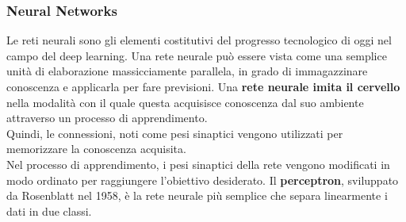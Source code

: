 \begin{frame}

	\frametitle{Neural Networks}

	Le reti neurali sono gli elementi costitutivi del progresso tecnologico di oggi nel campo del deep learning. Una rete neurale può essere vista come una semplice unità di elaborazione massicciamente parallela, in grado di immagazzinare conoscenza e applicarla per fare previsioni.
	\newlinedouble
	Una \textbf{rete neurale imita il cervello} nella modalità con il quale questa acquisisce conoscenza dal suo ambiente attraverso un processo di apprendimento.\\
	Quindi, le connessioni, noti come pesi sinaptici vengono utilizzati per memorizzare la conoscenza acquisita.\\
	Nel processo di apprendimento, i pesi sinaptici della rete vengono modificati in modo ordinato per raggiungere l'obiettivo desiderato.
	\newlinedouble
	Il \textbf{perceptron}, sviluppato da Rosenblatt nel 1958, è la rete neurale più semplice che separa linearmente i dati in due classi.

%
%
\end{frame}


